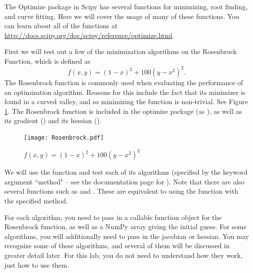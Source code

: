 \label{lab:Optimization1}

The Optimize package in Scipy has several functions for minimizing, root finding, and curve fitting. Here we will cover the usage of many of these functions.
You can learn about all of the functions at \url{http://docs.scipy.org/doc/scipy/reference/optimize.html}.

First we will test out a few of the minimization algorithms on the Rosenbrock Function, which is defined as
\[
f(x,y) = (1-x)^2 + 100(y-x^2)^2.
\]
The Rosenbrock function is commonly used when evaluating the performance of an optimization algorithm.
Reasons for this include the fact that its minimizer is found in a curved valley, and so minimizing the function is non-trivial.
See Figure \ref{opt:rosenbrock}.
The Rosenbrock function is included in the optimize package (as ), as well as its gradient () and its hessian ().

\begin{figure}
\texttt{[image: Rosenbrock.pdf]}
\caption{$f(x,y) = (1-x)^2 + 100(y-x^2)^2$}
\label{opt:rosenbrock}
\end{figure}

We will use the  function and test each of its algorithms (specified by the keyword argument ``method" -- see the documentation page for ).
Note that there are also several functions such as  and . These are equivalent to using the  function with the specified method.

For each algorithm, you need to pass in a callable function object for the Rosenbrock function, as well as a NumPy array giving the initial guess.
For some algorithms, you will additionally need to pass in the jacobian or hessian.
You may recognize some of these algorithms, and several of them will be discussed in greater detail later. For this lab, you do not need to understand how they work, just
how to use them.

